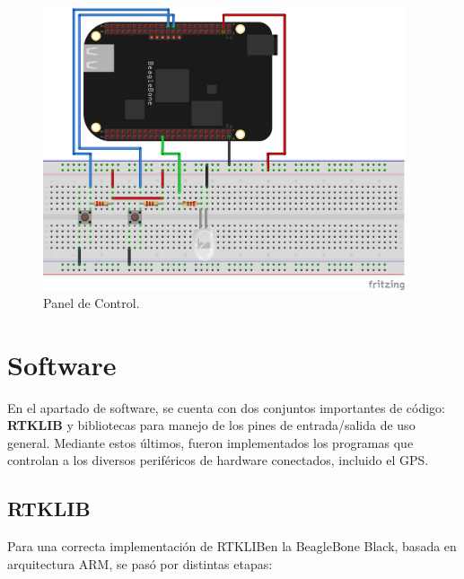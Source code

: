 \begin{figure}[H]
\centering
\includegraphics[width=0.95\textwidth]{Figures/ControlPanel}
\caption[Panel del Control.]{Panel de Control.}
\label{fig:ContPan}
\end{figure}

\section{Software}

En el apartado de software, se cuenta con dos conjuntos importantes de código: \textbf{RTKLIB} y bibliotecas para manejo de los pines de entrada/salida de uso general. Mediante estos últimos, fueron implementados los programas que controlan a los diversos periféricos de hardware conectados, incluido el GPS.

\subsection{RTKLIB}

Para una correcta implementación de RTKLIB\footnotemark en la BeagleBone Black, basada en arquitectura ARM, se pasó por distintas etapas:\\


